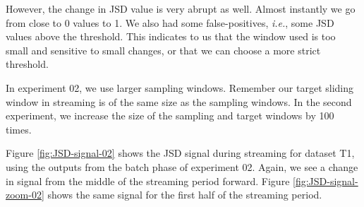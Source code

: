 However, the change in JSD value is very abrupt as well. Almost instantly we go from close to 0 values to 1. We also had some false-positives, \textit{i.e.}, some JSD values above the threshold. This indicates to us that the window used is too small and sensitive to small changes, or that we can choose a more strict threshold.

In experiment 02, we use larger sampling windows. Remember our target sliding window in streaming is of the same size as the sampling windows. In the second experiment, we increase the size of the sampling and target windows by 100 times.

Figure \ref{fig:JSD-signal-02} shows the JSD signal during streaming for dataset T1, using the outputs from the batch phase of experiment 02. Again, we see a change in signal from the middle of the streaming period forward. Figure \ref{fig:JSD-signal-zoom-02} shows the same signal for the first half of the streaming period.
